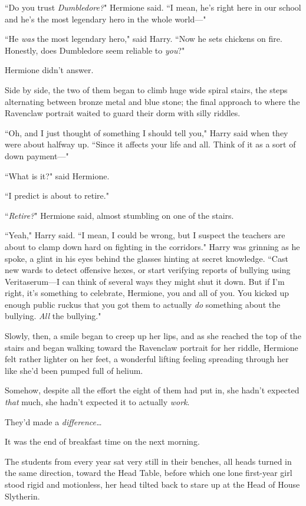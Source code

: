 ``Do you trust \emph{Dumbledore?}" Hermione said. ``I mean, he's right here in our school and he's the most legendary hero in the whole world—"

``He \emph{was} the most legendary hero," said Harry. ``Now he sets chickens on fire. Honestly, does Dumbledore seem reliable to \emph{you}?"

Hermione didn't answer.

Side by side, the two of them began to climb huge wide spiral stairs, the steps alternating between bronze metal and blue stone; the final approach to where the Ravenclaw portrait waited to guard their dorm with silly riddles.

``Oh, and I just thought of something I should tell you," Harry said when they were about halfway up. ``Since it affects your life and all. Think of it as a sort of down payment—"

``What is it?" said Hermione.

``I predict \SPHEW is about to retire."

``\emph{Retire?}" Hermione said, almost stumbling on one of the stairs.

``Yeah," Harry said. ``I mean, I could be wrong, but I suspect the teachers are about to clamp down hard on fighting in the corridors." Harry was grinning as he spoke, a glint in his eyes behind the glasses hinting at secret knowledge. ``Cast new wards to detect offensive hexes, or start verifying reports of bullying using Veritaserum—I can think of several ways they might shut it down. But if I'm right, it's something to celebrate, Hermione, you and all of you. You kicked up enough public ruckus that you got them to actually \emph{do} something about the bullying. \emph{All} the bullying."

Slowly, then, a smile began to creep up her lips, and as she reached the top of the stairs and began walking toward the Ravenclaw portrait for her riddle, Hermione felt rather lighter on her feet, a wonderful lifting feeling spreading through her like she'd been pumped full of helium.

Somehow, despite all the effort the eight of them had put in, she hadn't expected \emph{that} much, she hadn't expected it to actually \emph{work}.

They'd made a \emph{difference{\ldots}}

\later

It was the end of breakfast time on the next morning.

The students from every year sat very still in their benches, all heads turned in the same direction, toward the Head Table, before which one lone first-year girl stood rigid and motionless, her head tilted back to stare up at the Head of House Slytherin.

